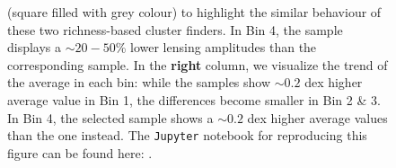\documentclass[fleqn,usenatbib,useAMS]{mnras}
\begin{document}
\begin{CJK*}{UTF8}{gbsn}
\begin{figure}
{        (square filled with grey colour) to highlight the similar behaviour of these two
        richness-based cluster finders.
        In Bin 4, the \redm{} sample displays a $\sim 20-50$\% lower lensing amplitudes than
        the corresponding  sample.
        In the \textbf{right} column, we visualize the trend of the average \mvir{} in each bin:
        while the \redm{} samples show $\sim 0.2$ dex higher average \mvir{} value in Bin 1,
        the differences become smaller in Bin 2 \& 3.
        In Bin 4, the  selected sample shows a $\sim 0.2$ dex higher average
        \mvir{} values than the \redm{} one instead.
        The \texttt{Jupyter} notebook for reproducing this figure can be found here:
        \href{https://github.com/dr-guangtou/jianbing/blob/master/notebooks/figure/fig9.ipynb}{\faGithub}.
        }
    \label{fig:mout_richness}
\end{figure}


\end{CJK*}
\end{document}

